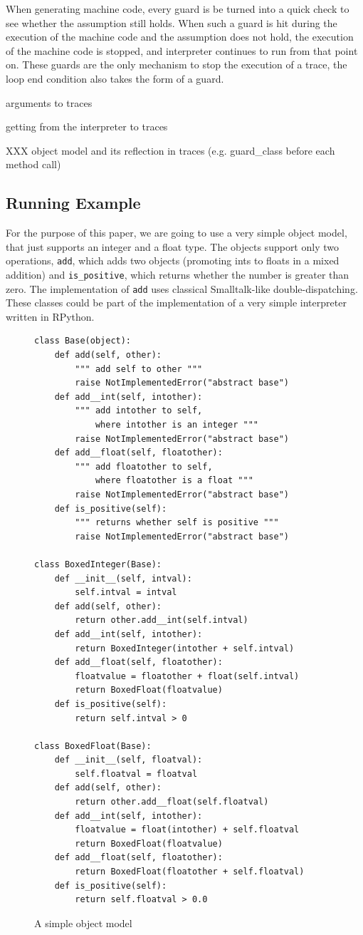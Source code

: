 \documentclass{sigplanconf}
\begin{document}
When generating machine code, every guard is be turned into a quick check to
see whether the assumption still holds. When such a guard is hit during the
execution of the machine code and the assumption does not hold, the execution of
the machine code is stopped, and interpreter continues to run from that point
on. These guards are the only mechanism to stop the execution of a trace, the
loop end condition also takes the form of a guard.


arguments to traces

getting from the interpreter to traces

XXX object model and its reflection in traces (e.g. guard\_class before each method call)

\subsection{Running Example}

For the purpose of this paper, we are going to use a very simple object
model, that just supports an integer and a float type. The objects support only
two operations, \texttt{add}, which adds two objects (promoting ints to floats in a
mixed addition) and \texttt{is\_positive}, which returns whether the number is greater
than zero. The implementation of \texttt{add} uses classical Smalltalk-like
double-dispatching. These classes could be part of the implementation of a very
simple interpreter written in RPython.

\begin{figure}
\begin{verbatim}
class Base(object):
    def add(self, other):
        """ add self to other """
        raise NotImplementedError("abstract base")
    def add__int(self, intother):
        """ add intother to self,
            where intother is an integer """
        raise NotImplementedError("abstract base")
    def add__float(self, floatother):
        """ add floatother to self,
            where floatother is a float """
        raise NotImplementedError("abstract base")
    def is_positive(self):
        """ returns whether self is positive """
        raise NotImplementedError("abstract base")

class BoxedInteger(Base):
    def __init__(self, intval):
        self.intval = intval
    def add(self, other):
        return other.add__int(self.intval)
    def add__int(self, intother):
        return BoxedInteger(intother + self.intval)
    def add__float(self, floatother):
        floatvalue = floatother + float(self.intval)
        return BoxedFloat(floatvalue)
    def is_positive(self):
        return self.intval > 0

class BoxedFloat(Base):
    def __init__(self, floatval):
        self.floatval = floatval
    def add(self, other):
        return other.add__float(self.floatval)
    def add__int(self, intother):
        floatvalue = float(intother) + self.floatval
        return BoxedFloat(floatvalue)
    def add__float(self, floatother):
        return BoxedFloat(floatother + self.floatval)
    def is_positive(self):
        return self.floatval > 0.0
\end{verbatim}
\caption{A simple object model}
\end{figure}
\end{document}
